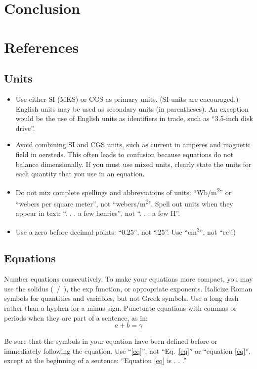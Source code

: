 \documentclass[conference]{IEEEtran}
\begin{document}
\section{Conclusion}
\section{References}
\subsection{Units}
\begin{itemize}
    \item Use either SI (MKS) or CGS as primary units. (SI units are encouraged.) English units may be used as secondary units (in parentheses). An exception would be the use of English units as identifiers in trade, such as ``3.5-inch disk drive''.
    \item Avoid combining SI and CGS units, such as current in amperes and magnetic field in oersteds. This often leads to confusion because equations do not balance dimensionally. If you must use mixed units, clearly state the units for each quantity that you use in an equation.
    \item Do not mix complete spellings and abbreviations of units: ``Wb/m\textsuperscript{2}'' or ``webers per square meter'', not ``webers/m\textsuperscript{2}''. Spell out units when they appear in text: ``. . . a few henries'', not ``. . . a few H''.
    \item Use a zero before decimal points: ``0.25'', not ``.25''. Use ``cm\textsuperscript{3}'', not ``cc''.)
\end{itemize}

\subsection{Equations}
Number equations consecutively. To make your
equations more compact, you may use the solidus (~/~), the exp function, or
appropriate exponents. Italicize Roman symbols for quantities and variables,
but not Greek symbols. Use a long dash rather than a hyphen for a minus
sign. Punctuate equations with commas or periods when they are part of a
sentence, as in:
\begin{equation}
    a+b=\gamma\label{eq}
\end{equation}

Be sure that the
symbols in your equation have been defined before or immediately following
the equation. Use ``\eqref{eq}'', not ``Eq.~\eqref{eq}'' or ``equation \eqref{eq}'', except at
the beginning of a sentence: ``Equation \eqref{eq} is . . .''
\end{document}
